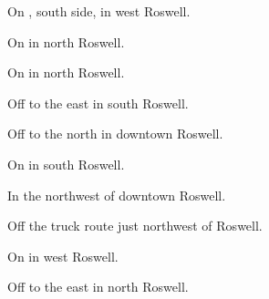 
\begin{LocationList}

On , south side, in west Roswell.

\Location{\GarageHQ \Garage}
On  in north Roswell.

\Location{\GasStation \Gas}
On  in north Roswell.

Off  to the east in south Roswell.

\Location{\RecruitmentAgency \Recruitment}
Off  to the north in downtown Roswell.

\Location{\RestArea \Rest}
On  in south Roswell.

In the northwest of downtown Roswell.

Off the  truck route just northwest of Roswell.

\Location{\TruckService \Service}
On  in west Roswell.

Off  to the east in north Roswell.

\end{LocationList}
